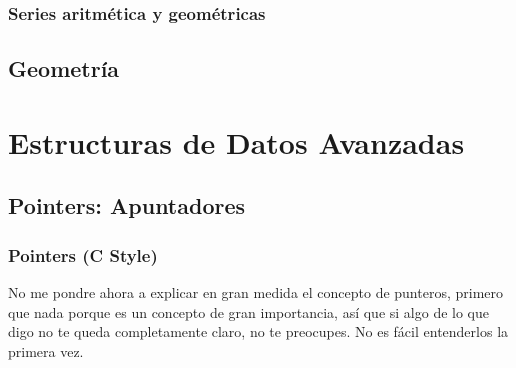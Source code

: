 \documentclass[12pt, fleqn]{report}                             %
\theoremstyle{break}                                            %
\begin{document}
        \section{Series aritmética y geométricas}

        
    \clearpage
    \chapter{Geometría}




\part{Estructuras de Datos Avanzadas}
\label{part:EstructurasDeDatosAvanzadas}

    \clearpage
    \chapter{Pointers: Apuntadores}


        \clearpage
        \section{Pointers (C Style)}

            No me pondre ahora a explicar en gran medida el concepto de punteros, 
            primero que nada porque es un concepto de gran importancia, así que si algo de lo que
            digo no te queda completamente claro, no te preocupes. No es fácil entenderlos la primera vez.
\end{document}
